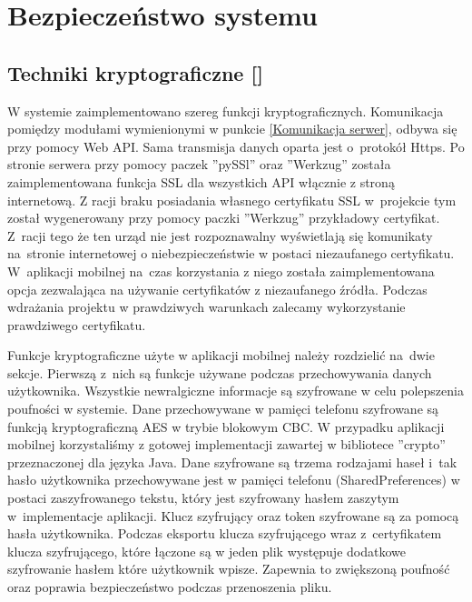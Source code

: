 \newpage
\section{Bezpieczeństwo systemu \textsl{\NazwaSys}} \label{sec:bezpieczenstwo}


\subsection{Techniki kryptograficzne [\StudentB]}\label{sec:techniki kryptograficzne}
W systemie \textsl{\NazwaSys} zaimplementowano szereg funkcji kryptograficznych. Komunikacja pomiędzy modułami wymienionymi w punkcie \ref{Komunikacja serwer}, odbywa się przy pomocy Web API. Sama transmisja danych oparta jest o~protokół Https. Po stronie serwera przy pomocy paczek ''pySSl'' oraz ''Werkzug'' została zaimplementowana funkcja SSL dla wszystkich API włącznie z stroną internetową. Z racji braku posiadania własnego certyfikatu SSL w~projekcie tym został wygenerowany przy pomocy paczki ''Werkzug'' przykładowy certyfikat. Z~racji tego że ten urząd nie jest rozpoznawalny wyświetlają się komunikaty na~stronie internetowej o niebezpieczeństwie w postaci niezaufanego certyfikatu. W~aplikacji mobilnej na~czas korzystania z niego została zaimplementowana opcja zezwalająca na używanie certyfikatów z niezaufanego źródła. Podczas wdrażania projektu w prawdziwych warunkach zalecamy wykorzystanie prawdziwego certyfikatu.

Funkcje kryptograficzne użyte w aplikacji mobilnej należy rozdzielić na~dwie sekcje. Pierwszą z~nich są funkcje używane podczas przechowywania danych użytkownika. Wszystkie newralgiczne informacje są szyfrowane w celu polepszenia poufności w systemie. Dane przechowywane w pamięci telefonu szyfrowane są funkcją kryptograficzną AES w trybie blokowym CBC. W przypadku aplikacji mobilnej korzystaliśmy z gotowej implementacji zawartej w bibliotece ''crypto'' przeznaczonej dla języka Java. Dane szyfrowane są trzema rodzajami haseł i~tak hasło użytkownika przechowywane jest w pamięci telefonu (SharedPreferences) w postaci zaszyfrowanego tekstu, który jest szyfrowany hasłem zaszytym w~implementacje aplikacji. Klucz szyfrujący oraz token szyfrowane są za pomocą hasła użytkownika. Podczas eksportu klucza szyfrującego wraz z~certyfikatem klucza szyfrującego, które łączone są w jeden plik   występuje dodatkowe szyfrowanie hasłem które użytkownik wpisze. Zapewnia to zwiększoną poufność oraz poprawia bezpieczeństwo podczas przenoszenia pliku.                

